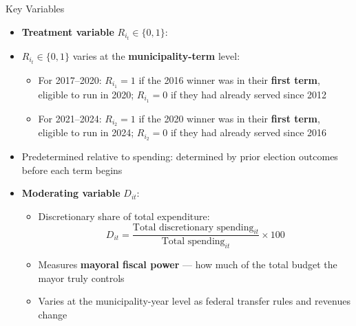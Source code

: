 \documentclass{beamer}
\begin{document}
\begin{frame}{Key Variables}
\begin{itemize}
    \item \textbf{Treatment variable} $R_{i_t} \in \{0,1\}$:
    \item $R_{i_t} \in \{0,1\}$ varies at the \textbf{municipality-term} level:
\begin{itemize}
    \item For 2017--2020: $R_{i_1} = 1$ if the 2016 winner was in their \textbf{first term}, eligible to run in 2020; $R_{i_1} = 0$ if they had already served since 2012
    \item For 2021--2024: $R_{i_2} = 1$ if the 2020 winner was in their \textbf{first term}, eligible to run in 2024; $R_{i_2} = 0$ if they had already served since 2016
\end{itemize}
\item Predetermined relative to spending: determined by prior election outcomes before each term begins
    \vspace{0.5em}
    \item \textbf{Moderating variable} $D_{it}$:
    \begin{itemize}
        \item Discretionary share of total expenditure:
        \begin{equation*}
            D_{it} = \frac{\text{Total discretionary spending}_{it}}{\text{Total spending}_{it}} \times 100
        \end{equation*}
        \item Measures \textbf{mayoral fiscal power} --- how much of the total budget the mayor truly controls
        \item Varies at the municipality-year level as federal transfer rules and revenues change
    \end{itemize}
\end{itemize}
\end{frame}
\end{document}
